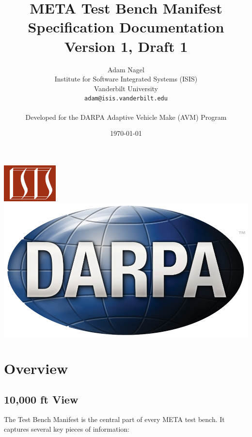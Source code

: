 \documentclass{article}
\begin{document}
\title{META Test Bench Manifest Specification Documentation\\Version 1, Draft 1}
\author{Adam Nagel\\
	Institute for Software Integrated Systems (ISIS)\\
	Vanderbilt University\\
	\texttt{adam@isis.vanderbilt.edu}\\
	\\
	Developed for the DARPA Adaptive Vehicle Make (AVM) Program}
\date{\today}

\maketitle

\begin{center}
\includegraphics[scale=0.75]{ISIS-logoNEW} \hspace{1cm} \includegraphics[scale=0.103]{DARPA-logo}
\end{center}

\tableofcontents

\section{Overview}

\subsection{10,000 ft View}
The Test Bench Manifest is the central part of every META test bench. It captures several key pieces of information:
\end{document}
